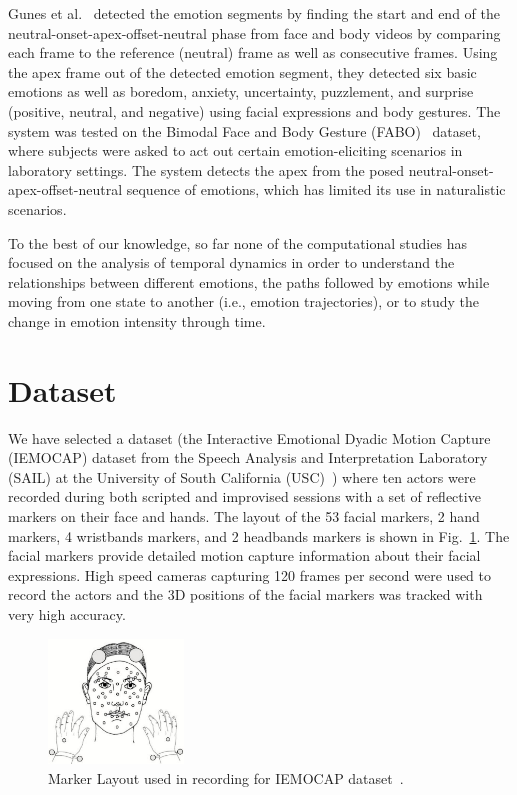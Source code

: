 \documentclass[10pt,journal,cspaper,compsoc]{IEEEtran}
\begin{document}
Gunes et al.~\cite{gunes2009automatic} detected the emotion segments by finding the start and end of the neutral-onset-apex-offset-neutral phase from face and body videos by comparing each frame to the reference (neutral) frame as well as consecutive frames. Using the apex frame out of the detected emotion segment, they detected six basic emotions as well as boredom, anxiety, uncertainty, puzzlement, and surprise (positive, neutral, and negative) using facial expressions and body gestures. The system was tested on the Bimodal Face and Body Gesture (FABO)~\cite{gunes2006bimodal} dataset, where subjects were asked to act out certain emotion-eliciting scenarios in laboratory settings. The system detects the apex from the posed neutral-onset-apex-offset-neutral sequence of emotions, which has limited its use in naturalistic scenarios.

To the best of our knowledge, so far none of the computational studies has focused on the analysis of temporal dynamics in order to understand the relationships between different emotions, the paths followed by emotions while moving from one state to another (i.e., emotion trajectories), or to study the change in emotion intensity through time.

\section{Dataset}
\label{sec_dataset}
We have selected a dataset (the Interactive Emotional Dyadic Motion Capture (IEMOCAP) dataset from the Speech Analysis and Interpretation Laboratory (SAIL) at the University of South California (USC)~\cite{Busso08}) where ten actors were recorded during both scripted and improvised sessions with a set of reflective markers on their face and hands. The layout of the 53 facial markers, 2 hand markers, 4 wristbands markers, and 2 headbands markers is shown in Fig.~\ref{fig_marker_layout}. The facial markers provide detailed motion capture information about their facial expressions. High speed cameras capturing 120 frames per second were used to record the actors and the 3D positions of the facial markers was tracked with very high accuracy. 

\begin{figure}[!]
\centering
\includegraphics[width=0.32\textwidth]{figures/Ch4/IEMOCAP_marker_positions.jpg}
\caption{Marker Layout used in recording for IEMOCAP dataset~\cite{Busso08}.}
\label{fig_marker_layout}
\end{figure}
\end{document}
